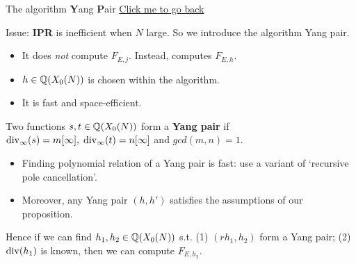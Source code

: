 \documentclass[handout]{beamer}
\begin{document}

\begin{frame}{The algorithm {\bf Y}ang {\bf P}air}
\hypertarget{yang pair}{}
\hyperlink{pr: algorithm}{\small{Click me to go back}}

Issue: \textbf{IPR} is inefficient when $N$ large. So we introduce the algorithm Yang pair. 

\pause 

\begin{itemize}
\item It does {\em not} compute $F_{E,j}$. Instead, computes $F_{E,h}$. \\
\item $h \in \mathbb{Q}(X_0(N))$ is chosen within the algorithm. \\
\item It is fast and space-efficient.
\end{itemize}

\pause


\begin{Def}[Y.Yang]
Two functions $s,t \in \mathbb{Q}(X_0(N))$ form a \textbf{Yang pair} if  $\operatorname{div}_{\infty}(s) = m[\infty],  \; \operatorname{div}_{\infty}(t) = n[\infty]$ and $gcd(m,n) = 1$.
\end{Def}

\pause

\begin{itemize}
\item Finding polynomial relation of a Yang pair is fast: use a variant of `recursive pole cancellation'. \\
\item Moreover, any Yang pair $(h,h')$ satisfies the assumptions of our proposition. 
\end{itemize}

\pause

Hence if we can find $h_1, h_2 \in \mathbb{Q}(X_0(N))$ s.t.  (1) $(rh_1, h_2)$ form a Yang pair; (2) $\operatorname{div}(h_1)$ is known, 
then we can compute $F_{E,h_2}$.
\end{frame}
\end{document}
